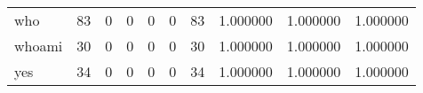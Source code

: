 \begin{longtable}{lrrrrrrrrr}
who       &                                        83 &                                                  0 &                                                  0 &                                                  0 &                                                  0 &                                                 83 &                                           1.000000 &                               1.000000 &                             1.000000 \\
whoami    &                                        30 &                                                  0 &                                                  0 &                                                  0 &                                                  0 &                                                 30 &                                           1.000000 &                               1.000000 &                             1.000000 \\
yes       &                                        34 &                                                  0 &                                                  0 &                                                  0 &                                                  0 &                                                 34 &                                           1.000000 &                               1.000000 &                             1.000000 \\
\end{longtable}
